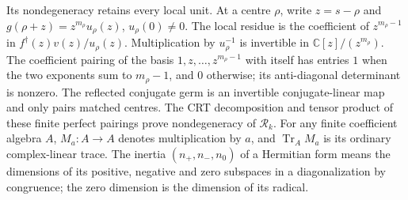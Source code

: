Its nondegeneracy retains every local unit. At a centre \(\rho\),
write \(z=s-\rho\) and \(g(\rho+z)=z^{m_\rho}u_\rho(z)\),
\(u_\rho(0)\ne0\). The local residue is the coefficient of
\(z^{m_\rho-1}\) in \(f^\dagger(z)v(z)/u_\rho(z)\).
Multiplication by \(u_\rho^{-1}\) is invertible in
\(\mathbb C[z]/(z^{m_\rho})\). The coefficient pairing of
the basis \(1,z,\ldots,z^{m_\rho-1}\) with itself has entries
\(1\) when the two exponents sum to \(m_\rho-1\), and \(0\) otherwise;
its anti-diagonal determinant is nonzero. The reflected conjugate
germ is an invertible conjugate-linear map and only pairs matched
centres. The CRT decomposition and tensor product of these finite
perfect pairings prove nondegeneracy of \(\mathscr R_k\).
For any finite coefficient algebra \(A\), \(M_a:A\to A\)
denotes multiplication by \(a\), and \(\operatorname{Tr}_A M_a\)
is its ordinary complex-linear trace. The inertia
\((n_+,n_-,n_0)\) of a Hermitian form means the dimensions of its
positive, negative and zero subspaces in a diagonalization by
congruence; the zero dimension is the dimension of its radical.
